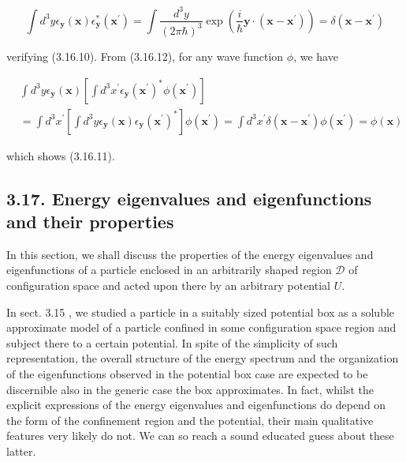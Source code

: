 \documentclass{article}
\begin{document}
\begin{equation*}
\int d^{3} y \epsilon_{\boldsymbol{y}}(\boldsymbol{x}) \epsilon_{\boldsymbol{y}}^{*}\left(\boldsymbol{x}^{\prime}\right)=\int \frac{d^{3} y}{(2 \pi \hbar)^{3}} \exp \left(\frac{i}{\hbar} \boldsymbol{y} \cdot\left(\boldsymbol{x}-\boldsymbol{x}^{\prime}\right)\right)=\delta\left(\boldsymbol{x}-\boldsymbol{x}^{\prime}\right) \tag{3.16.12}
\end{equation*}
 
verifying (3.16.10). From (3.16.12), for any wave function $\phi$, we have
 
\begin{align*}
& \int d^{3} y \epsilon_{\boldsymbol{y}}(\boldsymbol{x})\left[\int d^{3} x^{\prime} \epsilon_{\boldsymbol{y}}\left(\boldsymbol{x}^{\prime}\right)^{*} \phi\left(\boldsymbol{x}^{\prime}\right)\right]  \tag{3.16.13}\\
& =\int d^{3} x^{\prime}\left[\int d^{3} y \epsilon_{\boldsymbol{y}}(\boldsymbol{x}) \epsilon_{\boldsymbol{y}}\left(\boldsymbol{x}^{\prime}\right)^{*}\right] \phi\left(\boldsymbol{x}^{\prime}\right)=\int d^{3} x^{\prime} \delta\left(\boldsymbol{x}-\boldsymbol{x}^{\prime}\right) \phi\left(\boldsymbol{x}^{\prime}\right)=\phi(\boldsymbol{x})
\end{align*}
 
which shows (3.16.11).

\subsection*{3.17. Energy eigenvalues and eigenfunctions and their properties}

In this section, we shall discuss the properties of the energy eigenvalues and eigenfunctions of a particle enclosed in an arbitrarily shaped region $\mathcal{D}$ of configuration space and acted upon there by an arbitrary potential $U$.

In sect. 3.15 , we studied a particle in a suitably sized potential box as a soluble approximate model of a particle confined in some configuration space region and subject there to a certain potential. In spite of the simplicity of such representation, the overall structure of the energy spectrum and the organization of the eigenfunctions observed in the potential box case are expected to be discernible also in the generic case the box approximates. In fact, whilst the explicit expressions of the energy eigenvalues and eigenfunctions do depend on the form of the confinement region and the potential, their main qualitative features very likely do not. We can so reach a sound educated guess about these latter.
\end{document}
